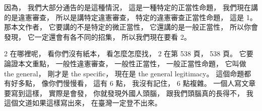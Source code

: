 \hypertarget{w02:cue:294}{}因為，
\hypertarget{w02:cue:295}{}我們大部分通告的是這種情況，
\hypertarget{w02:cue:296}{}這是一種特定的正當性命題，
\hypertarget{w02:cue:297}{}我們現在講的是違憲審查，
\hypertarget{w02:cue:298}{}所以是講特定違憲審查，
\hypertarget{w02:cue:299}{}特定的違憲審查正當性命題，
\hypertarget{w02:cue:300}{}這是 1。
\hypertarget{w02:cue:301}{}那本文作者，
\hypertarget{w02:cue:302}{}它要講的不是特定的微正當性，
\hypertarget{w02:cue:303}{}它還講的是一般正當性，
\hypertarget{w02:cue:304}{}所以你會發現，
\hypertarget{w02:cue:305}{}它一定還會有各不同的招集，
\hypertarget{w02:cue:306}{}所以我們現在要看 2。

\hypertarget{w02:cue:307}{}2 在哪裡呢，
\hypertarget{w02:cue:308}{}看你們沒有紙本，
\hypertarget{w02:cue:309}{}看怎麼怎麼找，
\hypertarget{w02:cue:310}{}2 在第 538 頁，
\hypertarget{w02:cue:311}{}538 頁。
\hypertarget{w02:cue:312}{}它要論證本文重點，
\hypertarget{w02:cue:313}{}一般性違憲審查，
\hypertarget{w02:cue:314}{}一般性正當性，
\hypertarget{w02:cue:315}{}一般正當性命題，
\hypertarget{w02:cue:316}{}它叫做 the general，
\hypertarget{w02:cue:317}{}剛才是 the specific，
\hypertarget{w02:cue:318}{}現在是 the general legitimacy。
\hypertarget{w02:cue:319}{}這個命題都有好多點，
\hypertarget{w02:cue:320}{}像你們慢慢看，
\hypertarget{w02:cue:321}{}這有 6 點，
\hypertarget{w02:cue:322}{}我沒有記住，
\hypertarget{w02:cue:323}{}6 點複雜。
\hypertarget{w02:cue:324}{}一個人寫文章要寫到這樣，
\hypertarget{w02:cue:325}{}實際是會發，
\hypertarget{w02:cue:326}{}你就發現外國人頭腦，
\hypertarget{w02:cue:327}{}跟我們頭腦真的長得不，
\hypertarget{w02:cue:328}{}我這個文道如果這樣寫出來，
\hypertarget{w02:cue:329}{}在臺灣一定登不出來。

